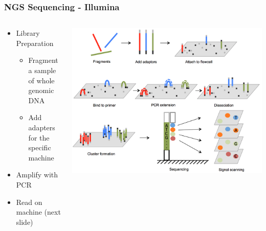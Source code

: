 \documentclass[14pt]{beamer}
\begin{document}
\begin{frame}
\frametitle{NGS Sequencing - Illumina}
\begin{columns}
	\begin{column}{0.5\textwidth}
		\begin{itemize}
			\item Library Preparation
			\begin{itemize}
				\item Fragment a sample of whole genomic DNA
				\item Add adapters for the specific machine
			\end{itemize}
			\item Amplify with PCR
			\item Read on machine (next slide)
		\end{itemize}
	\end{column}
	\begin{column}{0.5\textwidth}
    	\begin{center}
     		\includegraphics[width=1\textwidth]{images_20170905_illumina.png}
     	\end{center}
		\end{column}
	\end{columns}
\end{frame}
\end{document}
